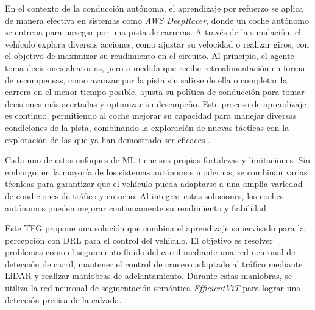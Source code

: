 En el contexto de la conducción autónoma, el aprendizaje por refuerzo se aplica de manera efectiva en sistemas como \textit{AWS DeepRacer}, donde un coche autónomo se entrena para navegar por una pista de carreras. A través de la simulación, el vehículo explora diversas acciones, como ajustar su velocidad o realizar giros, con el objetivo de maximizar su rendimiento en el circuito. Al principio, el agente toma decisiones aleatorias, pero a medida que recibe retroalimentación en forma de recompensas, como avanzar por la pista sin salirse de ella o completar la carrera en el menor tiempo posible, ajusta su política de conducción para tomar decisiones más acertadas y optimizar su desempeño. Este proceso de aprendizaje es continuo, permitiendo al coche mejorar su capacidad para manejar diversas condiciones de la pista, combinando la exploración de nuevas tácticas con la explotación de las que ya han demostrado ser eficaces \cite{ aws-deep-racer}.

Cada uno de estos enfoques de \ac{ML} tiene sus propias fortalezas y limitaciones. Sin embargo, en la mayoría de los sistemas autónomos modernos, se combinan varias técnicas para garantizar que el vehículo pueda adaptarse a una amplia variedad de condiciones de tráfico y entorno. Al integrar estas soluciones, los coches autónomos pueden mejorar continuamente su rendimiento y fiabilidad.

Este \ac{TFG} propone una solución que combina el aprendizaje supervisado para la percepción con \ac{DRL} para el control del vehículo. El objetivo es resolver problemas como el seguimiento fluido del carril mediante una red neuronal de detección de carril, mantener el control de crucero adaptado al tráfico mediante \ac{LiDAR} y realizar maniobras de adelantamiento. Durante estas maniobras, se utiliza la red neuronal de segmentación semántica \textit{EfficientViT} para lograr una detección precisa de la calzada.

